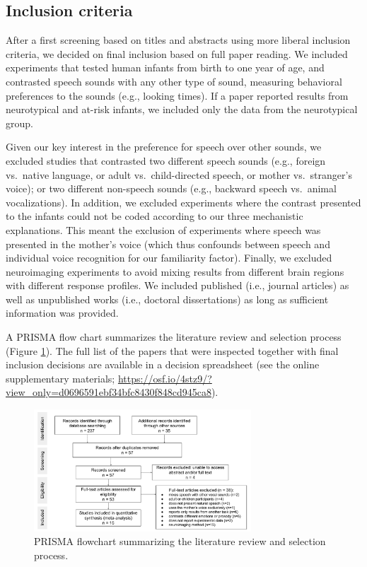 \documentclass[
  english,
  man]{apa6}
\begin{document}
\hypertarget{inclusion-criteria}{%
\subsection{Inclusion criteria}\label{inclusion-criteria}}

After a first screening based on titles and abstracts using more liberal inclusion criteria, we decided on final inclusion based on full paper reading. We included experiments that tested human infants from birth to one year of age, and contrasted speech sounds with any other type of sound, measuring behavioral preferences to the sounds (e.g., looking times). If a paper reported results from neurotypical and at-risk infants, we included only the data from the neurotypical group.

Given our key interest in the preference for speech over other sounds, we excluded studies that contrasted two different speech sounds (e.g., foreign vs.~native language, or adult vs.~child-directed speech, or mother vs.~stranger's voice); or two different non-speech sounds (e.g., backward speech vs.~animal vocalizations). In addition, we excluded experiments where the contrast presented to the infants could not be coded according to our three mechanistic explanations. This meant the exclusion of experiments where speech was presented in the mother's voice (which thus confounds between speech and individual voice recognition for our familiarity factor). Finally, we excluded neuroimaging experiments to avoid mixing results from different brain regions with different response profiles. We included published (i.e., journal articles) as well as unpublished works (i.e., doctoral dissertations) as long as sufficient information was provided.

A PRISMA flow chart summarizes the literature review and selection process (Figure \ref{fig:prisma}). The full list of the papers that were inspected together with final inclusion decisions are available in a decision spreadsheet (see the online supplementary materials; \url{https://osf.io/4stz9/?view_only=d0696591ebf34bfc8430f848cd945ca8}).

\begin{figure}
\includegraphics[width=3.2in]{figures_intro/PRISMA} \caption{PRISMA flowchart summarizing the literature review and selection process.}\label{fig:prisma}
\end{figure}
\end{document}
